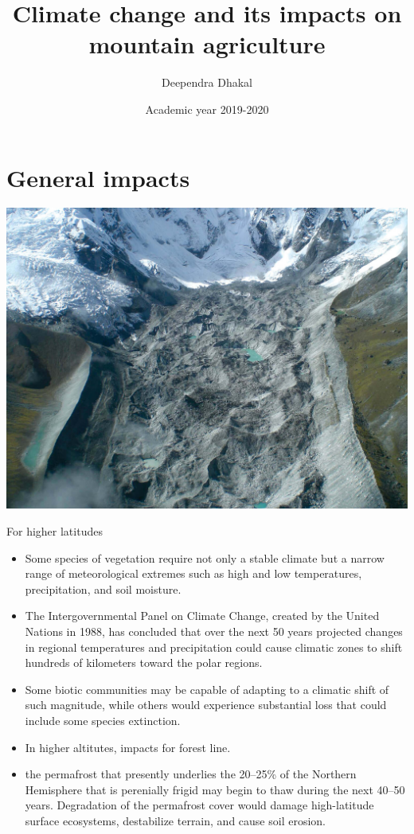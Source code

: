 \documentclass[
  ignorenonframetext,
  aspectratio=169]{beamer}
\title{Climate change and its impacts on mountain agriculture}
\author{Deependra Dhakal}
\date{Academic year 2019-2020}
\institute{GAASC, Baitadi \and Tribhuwan University}
\providecommand{\tightlist}{%
  \setlength{\itemsep}{0pt}\setlength{\parskip}{0pt}}
\begin{document}
\frame{\titlepage}

\begin{frame}[allowframebreaks]
  \tableofcontents[hideallsubsections]
\end{frame}
\hypertarget{general-impacts}{%
\section{General impacts}\label{general-impacts}}

\begin{frame}{}
\protect\hypertarget{section}{}
\begin{center}\includegraphics[width=0.7\linewidth]{../images/mountain_agriculture/Climate-change-impact-on-the-Himalaya} \end{center}
\end{frame}

\begin{frame}{For higher latitudes}
\protect\hypertarget{for-higher-latitudes}{}
\begin{itemize}
\tightlist
\item
  Some species of vegetation require not only a stable climate but a
  narrow range of meteorological extremes such as high and low
  temperatures, precipitation, and soil moisture.
\item
  The Intergovernmental Panel on Climate Change, created by the United
  Nations in 1988, has concluded that over the next 50 years projected
  changes in regional temperatures and precipitation could cause
  climatic zones to shift hundreds of kilometers toward the polar
  regions.
\item
  Some biotic communities may be capable of adapting to a climatic shift
  of such magnitude, while others would experience substantial loss that
  could include some species extinction.
\item
  In higher altitutes, impacts for forest line.
\item
  the permafrost that presently underlies the 20--25\% of the Northern
  Hemisphere that is perenially frigid may begin to thaw during the next
  40--50 years. Degradation of the permafrost cover would damage
  high-latitude surface ecosystems, destabilize terrain, and cause soil
  erosion.
\end{itemize}
\end{frame}
\end{document}
